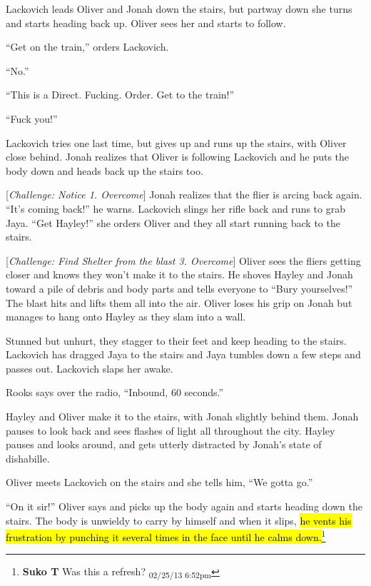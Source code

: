 Lackovich leads Oliver and Jonah down the stairs, but partway down she turns and starts heading back up.  Oliver sees her and starts to follow.

``Get on the train,'' orders Lackovich.

``No.''

``This is a Direct.  Fucking.  Order.  Get to the train!''

``Fuck you!''

Lackovich tries one last time, but gives up and runs up the stairs, with Oliver close behind.  Jonah realizes that Oliver is following Lackovich and he puts the body down and heads back up the stairs too.



{[}\textit{Challenge: Notice 1.  Overcome}{]}  Jonah realizes that the flier is arcing back again.  ``It's coming back!'' he warns.  Lackovich slings her rifle back and runs to grab Jaya.  ``Get Hayley!'' she orders Oliver and they all start running back to the stairs.



{[}\textit{Challenge: Find Shelter from the blast 3. Overcome}{]} Oliver sees the fliers getting closer and knows they won't make it to the stairs.  He shoves Hayley and Jonah toward a pile of debris and body parts and tells everyone to ``Bury yourselves!''   The blast hits and lifts them all into the air.  Oliver loses his grip on Jonah but manages to hang onto Hayley as they slam into a wall.  



Stunned but unhurt, they stagger to their feet and keep heading to the stairs.  Lackovich has dragged Jaya to the stairs and Jaya tumbles down a few steps and passes out.  Lackovich slaps her awake.



Rooks says over the radio, ``Inbound, 60 seconds.''



Hayley and Oliver make it to the stairs, with Jonah slightly behind them.  Jonah pauses to look back and sees flashes of light all throughout the city.  Hayley pauses and looks around, and gets utterly distracted by Jonah's state of dishabille.



Oliver meets Lackovich on the stairs and she tells him, ``We gotta go.''

``On it sir!'' Oliver says and picks up the body again and starts heading down the stairs.  The body is unwieldy to carry by himself and when it slips, \hl{he vents his frustration by punching it several times in the face until he calms down.}\footnote{\textbf{Suko T }Was this a refresh? \textsubscript{02/25/13 6:52pm}}




